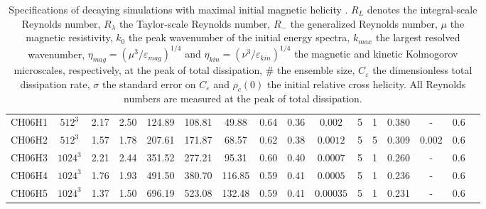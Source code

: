 \documentclass[aps,pre,onecolumn,superscriptaddress,notitlepage]{revtex4-1}
\newcommand{\Ceps}{C_\varepsilon}
\newcommand{\vep}{\varepsilon}
\newcommand{\blue}[1]{{#1}}
\begin{document}
\begin{table}[]
\begin{center}
\begin{tabular}{cccccccccccccccc}
  \hline
  CH06H1 & $512^3$ & 2.17  & 2.50 & 124.89 & 108.81 & 49.88 & 0.64 & 0.36 & $0.002$ & 5 & 1 & 0.380 & - & 0.6 \\
  CH06H2 & $512^3$ & 1.57 & 1.78 & 207.61 & 171.87 & 68.57 & 0.62 & 0.38& $0.0012$ & 5 & 5 & 0.309 & 0.002 & 0.6 \\
  CH06H3 & $1024^3$ & 2.21 & 2.44 & 351.52 & 277.21 & 95.31 & 0.60 & 0.40 & $0.0007$ & 5 & 1 & 0.260 & - & 0.6 \\
  CH06H4 & $1024^3$ & 1.76 & 1.93 & 491.50 & 380.70 & 116.85 & 0.59& 0.41 & $0.0005$ & 5 & 1 & 0.236 & - & 0.6 \\
  CH06H5 & $1024^3$ & 1.37 & 1.50 & 696.19 & 523.08 & 132.48 & 0.59 & 0.41& $0.00035$ & 5 & 1 & 0.231 & - & 0.6 \\
  \hline
  \end{tabular}
  \end{center}
 \caption{Specifications of decaying simulations with maximal initial magnetic helicity \cite{data15a,Linkmann15a}.
 $R_L$ denotes the integral-scale Reynolds number,
$R_{\lambda}$ the Taylor-scale Reynolds number,
 $R_{-}$ the generalized Reynolds number, $\mu$ the
 magnetic resistivity, $k_0$ the peak wavenumber of the initial energy spectra,
 $k_{max}$ the largest resolved wavenumber, 
\blue{$\eta_{mag} = (\mu^3/\vep_{mag})^{1/4} $ and $\eta_{kin} = (\nu^3/\vep_{kin})^{1/4}$ the magnetic
and kinetic Kolmogorov microscales, respectively, at the peak of total dissipation},
 \# the ensemble size, $\Ceps$ the dimensionless total dissipation rate, $\sigma$ the
 standard error on $\Ceps$ and $\rho_c(0)$ the initial relative cross helicity. All Reynolds numbers are measured
 at the peak of total dissipation.
 }
 \label{tbl:simulations_h}
 \end{table}
\end{document}
